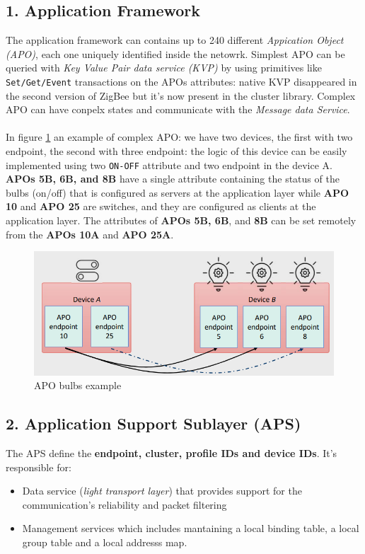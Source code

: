\documentclass[10pt,a4paper]{report}
\theoremstyle{definition}
\begin{document}
\subsection{1. Application Framework}\label{sec:1-application-framework}
The application framework can contains up to 240 different \textit{Appication Object (APO)}, each one uniquely identified inside the netowrk.
Simplest APO can be queried with \textit{Key Value Pair data service (KVP)} by using primitives like \texttt{Set/Get/Event} transactions on the APOs attributes: native KVP disappeared in the second version of ZigBee but it’s now present in the cluster library.
Complex APO can have conpelx states and communicate with the \textit{Message data Service}. \\\\
 In figure \ref{APO-ex1} an example of complex APO: we have two devices, the first with two endpoint, the second with three endpoint: the logic of this device can be easily implemented using two \texttt{ON-OFF} attribute and two endpoint in the device A.
\textbf{APOs 5B, 6B, and 8B} have a single attribute containing the status of the bulbs (on/off) that is configured as servers at the application layer while \textbf{APO 10} and \textbf{APO 25} are switches, and they are configured as clients at the application layer. The attributes of \textbf{APOs 5B, 6B}, and \textbf{8B} can be set remotely from the \textbf{APOs 10A} and  \textbf{APO 25A}.

\begin{figure}[h]
	\centering\includegraphics[scale=0.40]{images/Pasted image 20230311123327.png}
	\caption{APO bulbs example}
	\label{APO-ex1}
\end{figure}


\subsection{2. Application Support Sublayer (APS)}\label{sec:2-application-support-sublayer-aps}
The APS define the \textbf{endpoint, cluster, profile IDs and device IDs}. It's responsible for:
\begin{itemize}
	\item 
	Data service (\textit{light transport layer}) that provides support for the communication's reliability and packet filtering
	\item 
	Management services which includes mantaining a local binding table, a local group table and a local addresss map.
\end{itemize}
\end{document}
